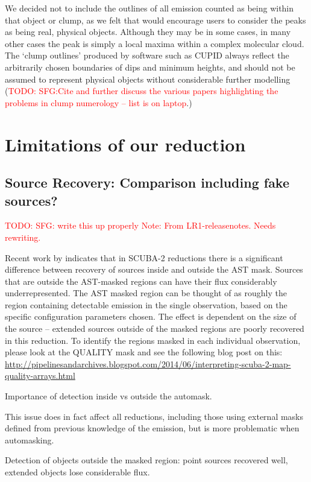 \documentclass[twocolumn]{aastex6}
\newcommand{\todo}[1]{\textcolor{red}{TODO: #1}}
\newcommand{\note}[1]{\textcolor{red}{Note: #1}}
\begin{document}
We decided not to include the outlines of all emission counted as
being within that object or clump, as we felt that would encourage
users to consider the peaks as being real, physical objects. Although
they may be in some cases, in many other cases the peak is simply a
local maxima within a complex molecular cloud. The `clump outlines'
produced by software such as CUPID always reflect the arbitrarily
chosen boundaries of dips and minimum heights, and should not be
assumed to represent physical objects without considerable further
modelling (\todo{SFG:Cite and further discuss the various papers
  highlighting the problems in clump numerology -- list is on
  laptop}.)


\section{Limitations of our reduction}


\subsection{Source Recovery: Comparison including fake sources?}
\todo{SFG: write this up properly}
\note{From LR1-releasenotes. Needs rewriting.}

Recent work by \citet{Mairs2015} indicates that
in SCUBA-2 reductions there is a significant difference between
recovery of sources inside and outside the AST mask. Sources that are
outside the AST-masked regions can have their flux considerably
underrepresented. The AST masked region can be thought of as roughly
the region containing detectable emission in the single observation,
based on the specific configuration parameters chosen. The effect is
dependent on the size of the source -- extended sources outside of the
masked regions are poorly recovered in this reduction. To identify the
regions masked in each individual observation, please look at the
QUALITY mask and see the following blog post on this:
\url{http://pipelinesandarchives.blogspot.com/2014/06/interpreting-scuba-2-map-quality-arrays.html}

Importance of detection inside vs outside the automask.

This issue does in fact affect all reductions, including those using
external masks defined from previous knowledge of the emission, but
is more problematic when automasking.

Detection of objects outside the masked region: point sources
recovered well, extended objects lose considerable flux.
\end{document}
